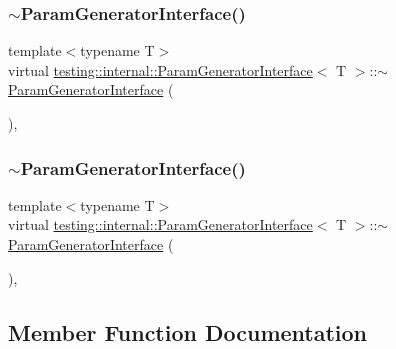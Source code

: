 \subsubsection{\texorpdfstring{$\sim$ParamGeneratorInterface()}{~ParamGeneratorInterface()}\hspace{0.1cm}{\footnotesize\ttfamily [2/3]}}
{\footnotesize\ttfamily template$<$typename T$>$ \\
virtual \mbox{\hyperlink{classtesting_1_1internal_1_1_param_generator_interface}{testing\+::internal\+::\+Param\+Generator\+Interface}}$<$ T $>$\+::$\sim$\mbox{\hyperlink{classtesting_1_1internal_1_1_param_generator_interface}{Param\+Generator\+Interface}} (\begin{DoxyParamCaption}{ }\end{DoxyParamCaption})\hspace{0.3cm}{\ttfamily [inline]}, {\ttfamily [virtual]}}

\mbox{\label{classtesting_1_1internal_1_1_param_generator_interface_ac2767cb9ad2e292e291c4903323c6eff}} 
\subsubsection{\texorpdfstring{$\sim$ParamGeneratorInterface()}{~ParamGeneratorInterface()}\hspace{0.1cm}{\footnotesize\ttfamily [3/3]}}
{\footnotesize\ttfamily template$<$typename T$>$ \\
virtual \mbox{\hyperlink{classtesting_1_1internal_1_1_param_generator_interface}{testing\+::internal\+::\+Param\+Generator\+Interface}}$<$ T $>$\+::$\sim$\mbox{\hyperlink{classtesting_1_1internal_1_1_param_generator_interface}{Param\+Generator\+Interface}} (\begin{DoxyParamCaption}{ }\end{DoxyParamCaption})\hspace{0.3cm}{\ttfamily [inline]}, {\ttfamily [virtual]}}



\subsection{Member Function Documentation}
\mbox{\label{classtesting_1_1internal_1_1_param_generator_interface_ae1de83b16fe9a53c67778a026c6a9569}} 
